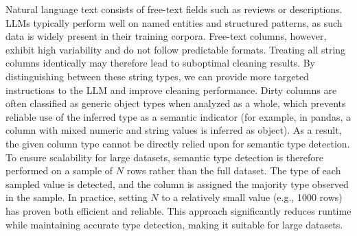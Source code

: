 Natural language text consists of free-text fields such as reviews or descriptions. 
LLMs typically perform well on named entities and structured patterns, as such data is widely present in their training corpora. 
Free-text columns, however, exhibit high variability and do not follow predictable formats. 
Treating all string columns identically may therefore lead to suboptimal cleaning results. 
By distinguishing between these string types, we can provide more targeted instructions to the LLM and improve cleaning performance.
\newline\newline
Dirty columns are often classified as generic object types when analyzed as a whole, which prevents reliable use of the inferred type as a semantic indicator (for example, in pandas, a column with mixed numeric and string values is inferred as object).
As a result, the given column type cannot be directly relied upon for semantic type detection.
To ensure scalability for large datasets, semantic type detection is therefore performed on a sample of $N$ rows rather than the full dataset.
The type of each sampled value is detected, and the column is assigned the majority type observed in the sample.
In practice, setting $N$ to a relatively small value (e.g., 1000 rows) has proven both efficient and reliable. 
This approach significantly reduces runtime while maintaining accurate type detection, making it suitable for large datasets.

